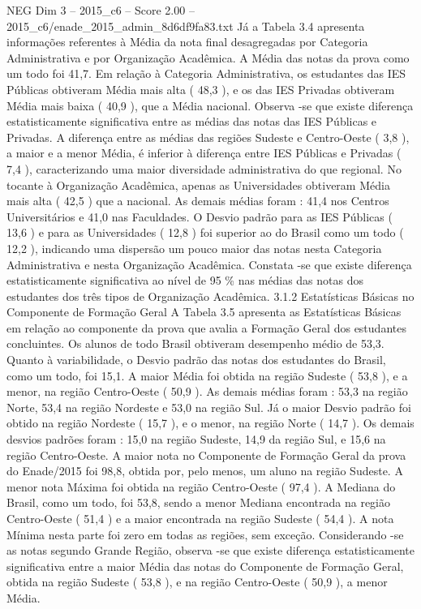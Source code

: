 \begin{textsample}{NEG Dim 3 – 2015\_c6 – Score 2.00 – 2015\_c6/enade\_2015\_admin\_8d6df9fa83.txt}
Já a Tabela 3.4 apresenta informações referentes à Média da nota final desagregadas por Categoria Administrativa e por Organização Acadêmica.
A Média das notas da prova como um todo foi 41,7.
Em relação à Categoria Administrativa, os estudantes das IES Públicas obtiveram Média mais alta ( 48,3 ), e os das IES Privadas obtiveram Média mais baixa ( 40,9 ), que a Média nacional.
Observa -se que existe diferença estatisticamente significativa entre as médias das notas das IES Públicas e Privadas.
A diferença entre as médias das regiões Sudeste e Centro-Oeste ( 3,8 ), a maior e a menor Média, é inferior à diferença entre IES Públicas e Privadas ( 7,4 ), caracterizando uma maior diversidade administrativa do que regional.
No tocante à Organização Acadêmica, apenas as Universidades obtiveram Média mais alta ( 42,5 ) que a nacional.
As demais médias foram : 41,4 nos Centros Universitários e 41,0 nas Faculdades.
O Desvio padrão para as IES Públicas ( 13,6 ) e para as Universidades ( 12,8 ) foi superior ao do Brasil como um todo ( 12,2 ), indicando uma dispersão um pouco maior das notas nesta Categoria Administrativa e nesta Organização Acadêmica.
Constata -se que existe diferença estatisticamente significativa ao nível de 95 \% nas médias das notas dos estudantes dos três tipos de Organização Acadêmica. 3.1.2 Estatísticas Básicas no Componente de Formação Geral A Tabela 3.5 apresenta as Estatísticas Básicas em relação ao componente da prova que avalia a Formação Geral dos estudantes concluintes.
Os alunos de todo Brasil obtiveram desempenho médio de 53,3.
Quanto à variabilidade, o Desvio padrão das notas dos estudantes do Brasil, como um todo, foi 15,1.
A maior Média foi obtida na região Sudeste ( 53,8 ), e a menor, na região Centro-Oeste ( 50,9 ).
As demais médias foram : 53,3 na região Norte, 53,4 na região Nordeste e 53,0 na região Sul.
Já o maior Desvio padrão foi obtido na região Nordeste ( 15,7 ), e o menor, na região Norte ( 14,7 ).
Os demais desvios padrões foram : 15,0 na região Sudeste, 14,9 da região Sul, e 15,6 na região Centro-Oeste.
A maior nota no Componente de Formação Geral da prova do Enade/2015 foi 98,8, obtida por, pelo menos, um aluno na região Sudeste.
A menor nota Máxima foi obtida na região Centro-Oeste ( 97,4 ).
A Mediana do Brasil, como um todo, foi 53,8, sendo a menor Mediana encontrada na região Centro-Oeste ( 51,4 ) e a maior encontrada na região Sudeste ( 54,4 ).
A nota Mínima nesta parte foi zero em todas as regiões, sem exceção.
Considerando -se as notas segundo Grande Região, observa -se que existe diferença estatisticamente significativa entre a maior Média das notas do Componente de Formação Geral, obtida na região Sudeste ( 53,8 ), e na região Centro-Oeste ( 50,9 ), a menor Média.

\end{textsample}
